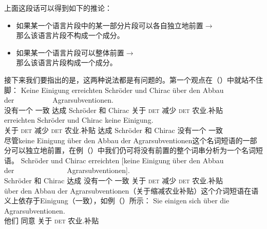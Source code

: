 \noindent
上面这段话可以得到如下的推论：
\begin{itemize}
\item 如果某一个语言片段中的某一部分片段可以各自独立地前置$\to$\\
	那么该语言片段不构成一个成分。
\item 如果某一个语言片段可以整体前置$\to$\\
	那么该语言片段构成一个成分。
\end{itemize}
接下来我们要指出的是，这两种说法都是有问题的。第一个观点在（）中就站不住脚：
\eal
\ex
\gll Keine Einigung erreichten Schröder und Chirac über den          Abbau der~~~~~~~~~~          Agrarsubventionen.\footnotemark\\
     没有一个    一致      达成        Schröder 和  Chirac 关于  \textsc{det} 减少  \textsc{det} 农业.补贴\\
\ex 
{}     erreichten Schröder und Chirac keine Einigung.\\
     \spacebr{}关于 \textsc{det} 减少 \textsc{det} 农业.补贴 达成 Schröder 和 Chirac 没有一个 一致\\
\zl
尽管keine Einigung über den Abbau der Agrarsubventionen这个名词短语的一部分可以独立地前置，在例（）中我们仍可将没有前置的整个词串分析为一个名词短语。
\ea
\gll Schröder und Chirac erreichten [keine Einigung über den Abbau der~~~~~~~~~~~~~~ Agrarsubventionen].\\
     Schröder 和 Chirac 达成 \spacebr{}没有一个 一致 关于 \textsc{det} 减少 \textsc{det} 农业.补贴\\
\z
über den Abbau der Agrarsubventionen（关于缩减农业补贴）这个介词短语在语义上依存于Einigung（一致），如例（）所示：
\ea
\gll Sie einigen sich über die Agrarsubventionen.\\
     他们 同意  关于 \textsc{det} 农业.补贴\\
\z

